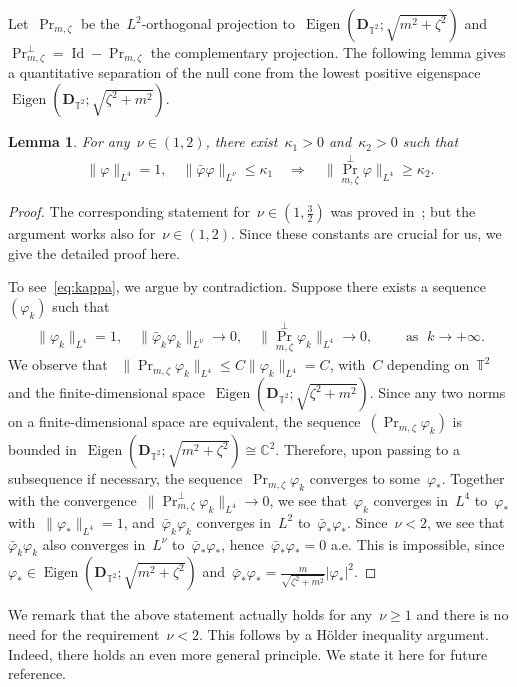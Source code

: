 \documentclass[10pt,a4paper]{amsart}
\newcommand{\C}{\mathbb{C}}
\newcommand{\T}{\mathbb{T}}
\newcommand{\pD}{\mathbf{D}}
\DeclareMathOperator{\Eigen}{Eigen}
\DeclareMathOperator{\id}{Id}
\DeclareMathOperator{\proj}{Pr}
\newtheorem{lemma}[thm]{Lemma}
\begin{document}
Let~$\proj_{m,\zeta}$ be the~$L^2$-orthogonal projection to~$\Eigen(\pD_{\T^2};\sqrt{m^2+\zeta^2})$ and~$\proj_{m,\zeta}^\perp = \id -\proj_{m,\zeta}$ the complementary projection.
The following lemma gives a quantitative separation of the null cone from the lowest positive eigenspace~$\Eigen(\pD_{\T^2};\sqrt{\zeta^2+m^2})$. 
\begin{lemma}\label{lemma:null-cone-separation}
    For any~$\nu\in (1,2)$, there exist~$\kappa_1>0$ and~$\kappa_2>0$ such that
    \begin{align}\label{eq:kappa}
        \|\varphi\|_{L^4}=1,\quad \|\bar{\varphi} \varphi\|_{L^\nu}\leq\kappa_1 \quad\Longrightarrow\quad \|\proj_{m,\zeta}^\perp \varphi\|_{L^4}\geq\kappa_2.
    \end{align}
\end{lemma}
\begin{proof}
    The corresponding statement for~$\nu\in(1,\frac{3}{2})$ was proved in~\cite{WZ2026Stationary}; but the argument works also for~$\nu\in (1,2)$.  
    Since these constants are crucial for us, we give the detailed proof here. 
    
    To see~\eqref{eq:kappa}, we argue by contradiction. 
    Suppose  there exists a sequence~$(\varphi_k)$ such that
    \begin{align}
        \|\varphi_k\|_{L^4}=1, \quad \|\bar{\varphi}_k\varphi_k\|_{L^\nu} \to 0,
        \quad \|\proj_{m,\zeta}^\perp \varphi_k\|_{L^4}\to 0, \qquad \mbox{ as } \; k\to+\infty.
    \end{align}
    We observe that ~$\|\proj_{m,\zeta}\varphi_k\|_{L^4}\leq C\|\varphi_k\|_{L^4}=C$, with~$C$ depending on~$\T^2$ and the finite-dimensional space~$\Eigen(\pD_{\T^2};\sqrt{\zeta^2+m^2})$. 
    Since any two norms on a finite-dimensional space are equivalent, the sequence~$(\proj_{m,\zeta}\varphi_k)$ is bounded in~$\Eigen(\pD_{\T^2};\sqrt{m^2+\zeta^2})\cong\C^2$. 
    Therefore, upon passing to a subsequence if necessary, the sequence~$\proj_{m,\zeta}\varphi_k$ converges to some~$\varphi_{*}$.
    Together with the convergence~$\|\proj_{m,\zeta}^\perp \varphi_k\|_{L^4}\to0$, we see that~$\varphi_k$ converges in~$L^4$ to~$\varphi_*$ with~$\|\varphi_{*}\|_{L^4}=1$, and~$\bar{\varphi}_k\varphi_k$ converges in~$L^2$ to~$\bar{\varphi}_*\varphi_*$. 
    Since~$\nu<2$, we see that~$\bar{\varphi}_k\varphi_k$ also converges in~$L^\nu$ to~$\bar{\varphi}_*\varphi_*$, hence~$\bar{\varphi}_*\varphi_*=0$ a.e. 
    This is impossible, since~$\varphi_*\in\Eigen(\pD_{\T^2};\sqrt{m^2+\zeta^2})$ and~$\bar{\varphi}_*\varphi_*= \frac{m}{\sqrt{\zeta^2 + m^2}}|\varphi_*|^2$.
    
\end{proof}
      We remark that the above statement actually holds for any~$\nu\geq 1$ and there is no need for the requirement~$\nu<2$.
      This follows by a H\"older inequality argument. 
      Indeed, there holds an even more general principle. 
      We state it here for future reference. 
\end{document}
